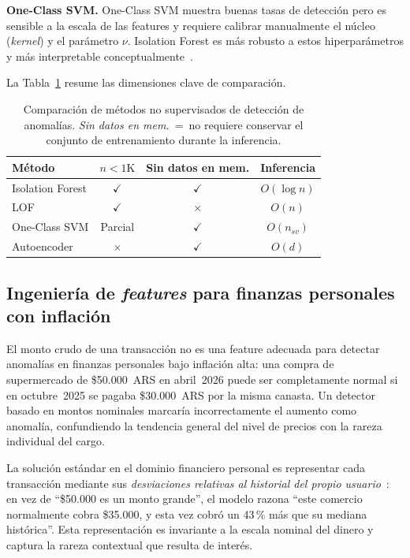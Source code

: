 \documentclass[conference]{IEEEtran}
\begin{document}
\textbf{One-Class SVM.}  One-Class SVM muestra buenas tasas de detecci\'on pero
es sensible a la escala de las features y requiere calibrar manualmente el n\'ucleo
(\emph{kernel}) y el par\'ametro $\nu$. Isolation Forest es m\'as robusto a estos
hiperpar\'ametros y m\'as interpretable conceptualmente~\cite{ounacer2018isolation}.

La Tabla~\ref{tab:methods} resume las dimensiones clave de comparaci\'on.

\begin{table}[h]
\caption{Comparaci\'on de m\'etodos no supervisados de detecci\'on de anomal\'ias.
  \emph{Sin datos en mem.}~=~no requiere conservar el conjunto de entrenamiento
  durante la inferencia.}
\label{tab:methods}
\centering
\begin{tabular}{lccc}
\toprule
\textbf{M\'etodo} & \textbf{$n < 1\text{K}$} & \textbf{Sin datos en mem.} & \textbf{Inferencia} \\
\midrule
Isolation Forest & $\checkmark$ & $\checkmark$ & $O(\log n)$  \\
LOF              & $\checkmark$ & $\times$     & $O(n)$       \\
One-Class SVM    & Parcial      & $\checkmark$ & $O(n_{sv})$  \\
Autoencoder      & $\times$     & $\checkmark$ & $O(d)$       \\
\bottomrule
\end{tabular}
\end{table}

\subsection{Ingenier\'ia de \emph{features} para finanzas personales con inflaci\'on}

El monto crudo de una transacci\'on no es una feature adecuada para detectar anomal\'ias
en finanzas personales bajo inflaci\'on alta: una compra de supermercado de
\$50.000~ARS en abril~2026 puede ser completamente normal si en octubre~2025 se pagaba
\$30.000~ARS por la misma canasta. Un detector basado en montos nominales marcar\'ia
incorrectamente el aumento como anomal\'ia, confundiendo la tendencia general del nivel
de precios con la rareza individual del cargo.

La soluci\'on est\'andar en el dominio financiero personal es representar cada
transacci\'on mediante sus \emph{desviaciones relativas al historial del propio
usuario}~\cite{budgeting2025ml, tavares2026inflation}: en vez de ``\$50.000 es un monto grande'', el modelo
razona ``este comercio normalmente cobra \$35.000, y esta vez cobr\'o un 43\,\% m\'as
que su mediana hist\'orica''. Esta representaci\'on es invariante a la escala nominal
del dinero y captura la rareza contextual que resulta de inter\'es.
\end{document}
